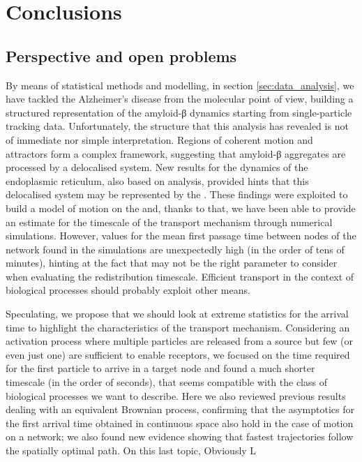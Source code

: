 
\chapter{Conclusions}

\section{Perspective and open problems}

By means of statistical methods and modelling, in section \ref{sec:data_analysis}, we have tackled the Alzheimer's disease from the molecular point of view, building a structured representation of the amyloid-β dynamics starting from single-particle tracking data.
Unfortunately, the structure that this analysis has revealed is not of immediate nor simple interpretation.
Regions of coherent motion and attractors form a complex framework, suggesting that amyloid-β aggregates are processed by a delocalised system.
New results for the dynamics of the endoplasmic reticulum, also based on  analysis, provided hints that this delocalised system may be represented by the .
These findings were exploited to build a model of motion on the  and, thanks to that, we have been able to provide an estimate for the timescale of the  transport mechanism through numerical simulations.
However, values for the mean first passage time between nodes of the network found in the simulations are unexpectedly high (in the order of tens of minutes), hinting at the fact that  may not be the right parameter to consider when evaluating the redistribution timescale. Efficient transport in the context of biological processes should probably exploit other means.

Speculating, we propose that we should look at extreme statistics for the arrival time to highlight the characteristics of the transport mechanism.
Considering an activation process where multiple particles are released from a source but few (or even just one) are sufficient to enable receptors, we focused on the time required for the first particle to arrive in a target node and found a much shorter timescale (in the order of seconds), that seems compatible with the class of biological processes we want to describe.
Here we also reviewed previous results dealing with an equivalent Brownian process, confirming that the asymptotics for the first arrival time obtained in continuous space also hold in the case of motion on a network; we also found new evidence showing that fastest trajectories follow the spatially optimal path.
On this last topic, %
Obviously
L

